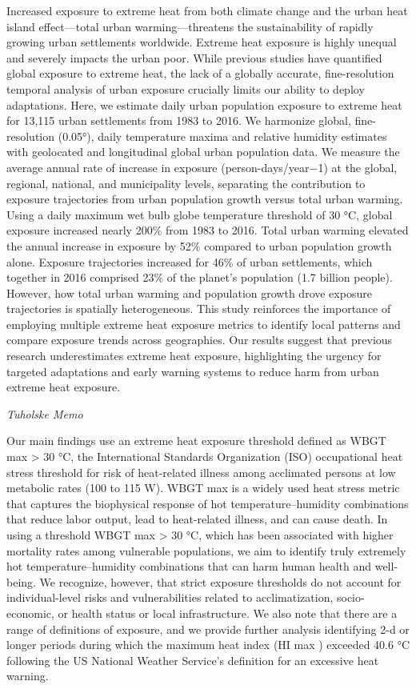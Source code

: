 \documentclass[
]{book}
\begin{document}
Increased exposure to extreme heat from both climate change and the urban heat island effect---total urban warming---threatens the sustainability of rapidly growing urban settlements worldwide. Extreme heat exposure is highly unequal and severely impacts the urban poor. While previous studies have quantified global exposure to extreme heat, the lack of a globally accurate, fine-resolution temporal analysis of urban exposure crucially limits our ability to deploy adaptations. Here, we estimate daily urban population exposure to extreme heat for 13,115 urban settlements from 1983 to 2016. We harmonize global, fine-resolution (0.05°), daily temperature maxima and relative humidity estimates with geolocated and longitudinal global urban population data. We measure the average annual rate of increase in exposure (person-days/year−1) at the global, regional, national, and municipality levels, separating the contribution to exposure trajectories from urban population growth versus total urban warming. Using a daily maximum wet bulb globe temperature threshold of 30 °C, global exposure increased nearly 200\% from 1983 to 2016. Total urban warming elevated the annual increase in exposure by 52\% compared to urban population growth alone. Exposure trajectories increased for 46\% of urban settlements, which together in 2016 comprised 23\% of the planet's population (1.7 billion people). However, how total urban warming and population growth drove exposure trajectories is spatially heterogeneous. This study reinforces the importance of employing multiple extreme heat exposure metrics to identify local patterns and compare exposure trends across geographies. Our results suggest that previous research underestimates extreme heat exposure, highlighting the urgency for targeted adaptations and early warning systems to reduce harm from urban extreme heat exposure.

\emph{Tuholske Memo}

Our main findings use an extreme heat exposure threshold defined as
WBGT max \textgreater{} 30 °C, the
International Standards Organization (ISO) occupational heat
stress threshold for risk of heat-related illness among acclimated
persons at low metabolic rates (100 to 115 W). WBGT max is a
widely used heat stress metric that captures the biophysical
response of hot temperature--humidity combinations
that reduce labor output, lead to heat-related illness, and
can cause death. In using a threshold WBGT max \textgreater{} 30 °C,
which has been associated with higher mortality rates among
vulnerable populations, we aim to identify truly extremely hot
temperature--humidity combinations that can harm human
health and well-being.
We recognize, however, that strict exposure
thresholds do not account for individual-level risks and
vulnerabilities related to acclimatization, socio-economic, or health status
or local infrastructure. We also note that there are a
range of definitions of exposure, and we provide further analysis
identifying 2-d or longer periods during which the maximum heat
index (HI max ) exceeded 40.6 °C
following the US National Weather Service's definition for an
excessive heat warning.
\end{document}
